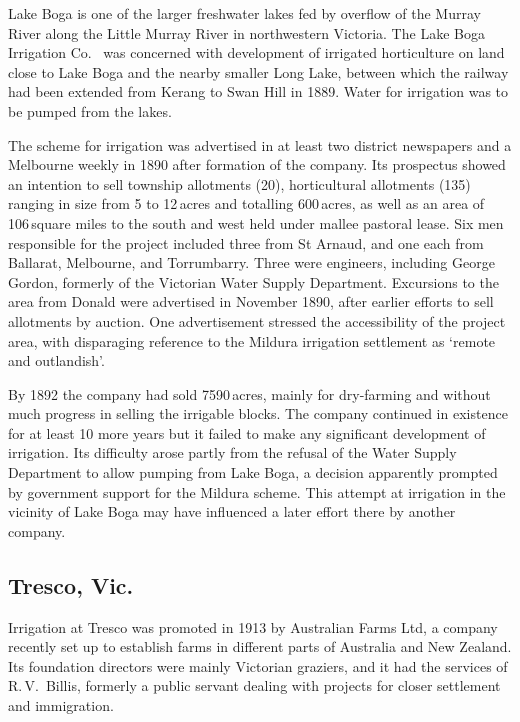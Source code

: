 Lake Boga is one of the larger freshwater lakes fed by overflow of the
Murray River along the Little Murray River 
in northwestern Victoria.  The Lake Boga Irrigation Co.\  was concerned with development of irrigated
horticulture on land close to Lake Boga and the nearby smaller Long
Lake,  between which the railway had been extended
from Kerang  to Swan Hill  in
1889.  Water for irrigation was to be pumped from the
lakes.

The scheme for irrigation was advertised in at least two district
newspapers and a Melbourne weekly in 1890 after formation of the
company.  Its prospectus showed an intention to sell township
allotments (20), horticultural allotments (135) ranging in size from 5
to 12\,acres and totalling 600\,acres, as well as an area of
106\,square miles to the south and west held under mallee pastoral
lease. Six men responsible for the project included three from St
Arnaud, and one each from Ballarat, Melbourne, and Torrumbarry.  Three
were engineers, including George Gordon, formerly of the Victorian
Water Supply Department.  Excursions to the area from Donald were
advertised in November 1890, after earlier efforts to sell allotments
by auction.  One advertisement stressed the accessibility of the
project area, with disparaging reference to the Mildura irrigation
settlement as `remote and outlandish'.

By 1892 the company had sold 7590\,acres, mainly for dry-farm\-ing and
without much progress in selling the irrigable blocks.  The company
continued in existence for at least 10 more years but it failed to
make any significant development of irrigation.  Its difficulty arose
partly from the refusal of the Water Supply Department to allow
pumping from Lake Boga, a decision apparently prompted by government
support for the Mildura scheme.  This attempt at irrigation in the
vicinity of Lake Boga may have influenced a later effort there by
another company.

\subsection*{Tresco, Vic.}

Irrigation at Tresco was promoted in 1913 by Australian Farms Ltd, a
company recently set up to establish farms in different parts of
Australia and New Zealand.  Its foundation directors were mainly
Victorian graziers, and it had the services of R.\,V.~Billis,
 formerly
a public servant dealing with projects for closer settlement and
immigration.

